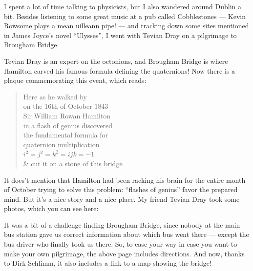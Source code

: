 \documentclass{article}
\def\tightlist{}
\renewcommand{\texttt}[1]{%
  \begingroup
  \ttfamily
  \begingroup\lccode`~=`/\lowercase{\endgroup\def~}{/\discretionary{}{}{}}%
  \begingroup\lccode`~=`[\lowercase{\endgroup\def~}{[\discretionary{}{}{}}%
  \begingroup\lccode`~=`.\lowercase{\endgroup\def~}{.\discretionary{}{}{}}%
  \catcode`/=\active\catcode`[=\active\catcode`.=\active
  \scantokens{#1\noexpand}%
  \endgroup
}
\begin{document}

I spent a lot of time talking to physicists, but I also wandered around
Dublin a bit. Besides listening to some great music at a pub called
Cobblestones --- Kevin Rowsome plays a mean uilleann pipe! --- and
tracking down some sites mentioned in James Joyce's novel ``Ulysses'', I
went with Tevian Dray on a pilgrimage to Brougham Bridge.

Tevian Dray is an expert on the octonions, and Brougham Bridge is where
Hamilton carved his famous formula defining the quaternions! Now there
is a plaque commemorating this event, which reads:

\begin{quote}
Here as he walked by\\
on the 16th of October 1843\\
Sir William Rowan Hamilton\\
in a flash of genius discovered\\
the fundamental formula for\\
quaternion multiplication\\
\(i^2 = j^2 = k^2 = ijk = -1\)\\
\& cut it on a stone of this bridge
\end{quote}

It does't mention that Hamilton had been racking his brain for the
entire month of October trying to solve this problem: ``flashes of
genius'' favor the prepared mind. But it's a nice story and a nice
place. My friend Tevian Dray took some photos, which you can see here:


It was a bit of a challenge finding Brougham Bridge, since nobody at the
main bus station gave us correct information about which bus went there
--- except the bus driver who finally took us there. So, to ease your
way in case you want to make your own pilgrimage, the above page
includes directions. And now, thanks to Dirk Schlimm, it also includes a
link to a map showing the bridge!
\end{document}
